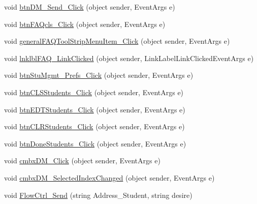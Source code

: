 \begin{DoxyCompactItemize}
\item 
void \hyperlink{class_sr_p___classroom_inq_1_1frm_classrrom_inq_ad2f643a739ae01acd4348b4fc6308c8c}{btn\-D\-M\-\_\-\-Send\-\_\-\-Click} (object sender, \-Event\-Args e)
\item 
void \hyperlink{class_sr_p___classroom_inq_1_1frm_classrrom_inq_a93a45d68634c479c06af534ed4afc931}{btn\-F\-A\-Qcls\-\_\-\-Click} (object sender, \-Event\-Args e)
\item 
void \hyperlink{class_sr_p___classroom_inq_1_1frm_classrrom_inq_ac3c424bfd93cbc8139b68630e94c1317}{general\-F\-A\-Q\-Tool\-Strip\-Menu\-Item\-\_\-\-Click} (object sender, \-Event\-Args e)
\item 
void \hyperlink{class_sr_p___classroom_inq_1_1frm_classrrom_inq_a49fb3826a76731f1fed16eb3dd473bb6}{lnklbl\-F\-A\-Q\-\_\-\-Link\-Clicked} (object sender, \-Link\-Label\-Link\-Clicked\-Event\-Args e)
\item 
void \hyperlink{class_sr_p___classroom_inq_1_1frm_classrrom_inq_a498e01ce0af00872271b09d5aa621e38}{btn\-Stu\-Mgmt\-\_\-\-Prefs\-\_\-\-Click} (object sender, \-Event\-Args e)
\item 
void \hyperlink{class_sr_p___classroom_inq_1_1frm_classrrom_inq_a84063ccbe84b1c95a224444f0b43ccd1}{btn\-C\-L\-S\-Students\-\_\-\-Click} (object sender, \-Event\-Args e)
\item 
void \hyperlink{class_sr_p___classroom_inq_1_1frm_classrrom_inq_a589f749ca29e7874f8dc92b06060f72a}{btn\-E\-D\-T\-Students\-\_\-\-Click} (object sender, \-Event\-Args e)
\item 
void \hyperlink{class_sr_p___classroom_inq_1_1frm_classrrom_inq_ad9679cab85677e96603f27eb5630e3be}{btn\-C\-L\-R\-Students\-\_\-\-Click} (object sender, \-Event\-Args e)
\item 
void \hyperlink{class_sr_p___classroom_inq_1_1frm_classrrom_inq_a7aa5b8355b30dbfd5a4e1990cd8864b5}{btn\-Done\-Students\-\_\-\-Click} (object sender, \-Event\-Args e)
\item 
void \hyperlink{class_sr_p___classroom_inq_1_1frm_classrrom_inq_a105ddb3794784250c1beb387646a9987}{cmbx\-D\-M\-\_\-\-Click} (object sender, \-Event\-Args e)
\item 
void \hyperlink{class_sr_p___classroom_inq_1_1frm_classrrom_inq_a40bf38cbcd4b97f6a32a4f10ea1e6f94}{cmbx\-D\-M\-\_\-\-Selected\-Index\-Changed} (object sender, \-Event\-Args e)
\item 
void \hyperlink{class_sr_p___classroom_inq_1_1frm_classrrom_inq_a86afd1a828832b2cd08c3570a05c6047}{\-Flow\-Ctrl\-\_\-\-Send} (string \-Address\-\_\-\-Student, string desire)

\end{DoxyCompactItemize}
